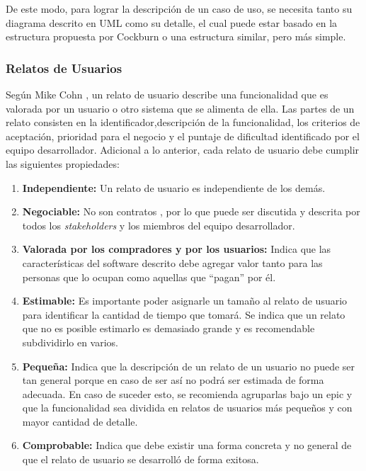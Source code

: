 De este modo, para lograr la descripción de un caso de uso, se necesita tanto su diagrama descrito en UML como su detalle, el cual puede estar basado en la estructura propuesta por Cockburn o una estructura similar, pero más simple.

\subsubsection{Relatos de Usuarios \label{sec:user_stories}}

Según Mike Cohn \cite{user_stories_applied}, un relato de usuario describe una funcionalidad que es valorada por un usuario o otro sistema que se alimenta de ella.  Las partes de un relato consisten en la identificador,descripción de la funcionalidad, los criterios de aceptación, prioridad para el negocio y el puntaje de dificultad identificado por el equipo desarrollador. Adicional a lo anterior, cada relato de usuario debe cumplir las siguientes propiedades:

\begin{enumerate}
  \item \textbf{Independiente:} Un relato de usuario es independiente de los demás.
  \item \textbf{Negociable:} No son contratos , por lo que puede ser discutida y descrita por todos los \textit{stakeholders} y los miembros del equipo desarrollador.
  \item \textbf{Valorada por los compradores y por los usuarios:} Indica que las características del software descrito debe agregar valor tanto para las personas que lo ocupan como aquellas que “pagan” por él.
  \item \textbf{Estimable:} Es importante poder asignarle un tamaño al relato de usuario para identificar la cantidad de tiempo que tomará. Se indica que un relato que no es posible estimarlo es demasiado grande y es recomendable subdividirlo en varios.
  \item \textbf{Pequeña:} Indica que la descripción de un relato de un usuario no puede ser tan general porque en caso de ser así no podrá ser estimada de forma adecuada. En caso de suceder esto, se recomienda agruparlas bajo un epic  y que la funcionalidad  sea dividida en relatos de usuarios más pequeños y con mayor cantidad de detalle.
  \item \textbf{Comprobable:} Indica que debe existir una forma concreta y no general de que el relato de usuario se desarrolló de forma exitosa.
\end{enumerate}

